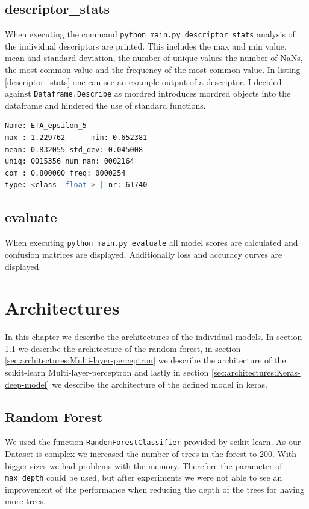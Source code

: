 \documentclass[12pt]{article}
\begin{document}
\subsection{descriptor\_stats}
When executing the command \texttt{python main.py descriptor\_stats} analysis of the individual descriptors are printed. This includes the max and min value, mean and standard deviation, the number of unique values the number of NaNs, the most common value and the frequency of the most common value. In listing \ref{descriptor_stats} one can see an example output of a descriptor. I decided against \texttt{Dataframe.Describe} as mordred introduces mordred objects into the dataframe and hindered the use of standard functions. 

\begin{lstlisting}[language=bash,caption={Statistics about the ETA\_espilon\_5 descriptor},label=descriptor_stats]
Name: ETA_epsilon_5  
max : 1.229762      min: 0.652381
mean: 0.832055 std_dev: 0.045008
uniq: 0015356 num_nan: 0002164
com : 0.800000 freq: 0000254 
type: <class 'float'> | nr: 61740  
\end{lstlisting}

\subsection{evaluate}
When executing \texttt{python main.py evaluate} all model scores are calculated and confusion matrices are displayed. Additionally loss and accuracy curves are displayed.

\section{Architectures}
\label{sec:architectures}
In this chapter we describe the architectures of the individual models. In section \ref{sec:architectures:random forest} we describe the architecture of the random forest, in section \ref{sec:architectures:Multi-layer-perceptron} we describe the architecture of the scikit-learn Multi-layer-perceptron and lastly in section \ref{sec:architectures:Keras-deep-model} we describe the architecture of the defined model in keras.

\subsection{Random Forest}
\label{sec:architectures:random forest}
We used the function \texttt{RandomForestClassifier} provided by scikit learn. As our Dataset is complex we increased the number of trees in the forest to 200. With bigger sizes we had problems with the memory. Therefore the parameter of \texttt{max\_depth} could be used, but after experiments we were not able to see an improvement of the performance when reducing the depth of the trees for having more trees.
\end{document}
